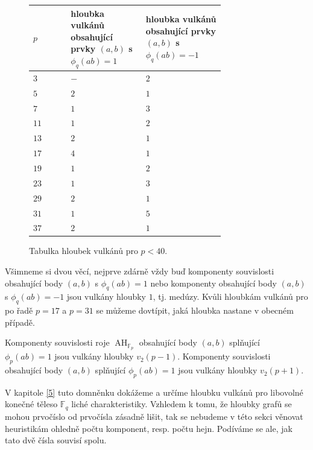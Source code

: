\documentclass[12pt]{report}
\DeclareMathOperator{\AH}{AH}
\begin{document}
\begin{figure}[h]
 \begin{longtable}[H]{>{\raggedright\arraybackslash}p{0.15\linewidth}p{0.3\linewidth}p{0.3\linewidth}}
\toprule
$p$ & hloubka vulkánů obsahující prvky $(a,b)$ s $\phi_q(ab)=1$ & hloubka vulkánů obsahující prvky $(a,b)$ s $\phi_q(ab)=-1$ \\
\midrule
$3$ & \noindent $-$ & \noindent $2$\\
$5$ & \noindent $2$ & \noindent $1$\\
$7$ & \noindent $1$ & \noindent $3$\\
$11$ & \noindent $1$ & \noindent $2$\\
$13$ & \noindent $2$ & \noindent $1$\\
$17$ & \noindent $4$ & \noindent $1$\\
$19$ & \noindent $1$ & \noindent $2$\\
$23$ & \noindent $1$ & \noindent $3$\\
$29$ & \noindent $2$ & \noindent $1$\\
$31$ & \noindent $1$ & \noindent $5$\\
$37$ & \noindent $2$ & \noindent $1$\\
\bottomrule 
\end{longtable}
\caption{Tabulka hloubek vulkánů pro $p < 40$.}
\end{figure}

Všimneme si dvou věcí, nejprve zdárně vždy buď komponenty souvislosti obsahující body $(a,b)$ s $\phi_q(ab)=1$ nebo komponenty obsahující body $(a,b)$ s $\phi_q(ab)=-1$ jsou vulkány hloubky $1$, tj. medúzy. Kvůli hloubkám vulkánů pro po řadě $p=17$ a $p=31$ se můžeme dovtípit, jaká hloubka nastane v obecném případě.\\

\begin{domnenka}
Komponenty souvislosti roje $\AH_{\mathbb{F}_p}$ obsahující body $(a,b)$ splňující $\phi_p(ab)=1$ jsou vulkány hloubky $v_2(p-1)$. Komponenty souvislosti obsahující body $(a,b)$ splňující $\phi_p(ab)=1$ jsou vulkány hloubky $v_2(p+1)$.
\end{domnenka}

V kapitole \ref{5} tuto domněnku dokážeme a určíme hloubku vulkánů pro libovolné konečné těleso $\mathbb{F}_q$ liché charakteristiky. Vzhledem k tomu, že hloubky grafů se mohou prvočíslo od prvočísla zásadně lišit, tak se nebudeme v této sekci věnovat heuristikám ohledně počtu komponent, resp. počtu hejn. Podíváme se ale, jak tato dvě čísla souvisí spolu.
\end{document}

